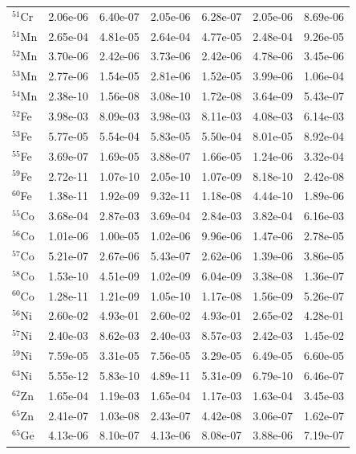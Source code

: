 \begin{table}
\begin{tabular}{l|cc|cc|cc}
$^{51}$Cr & 2.06e-06 & 6.40e-07 & 2.05e-06 & 6.28e-07 & 2.05e-06 & 8.69e-06\\
$^{51}$Mn & 2.65e-04 & 4.81e-05 & 2.64e-04 & 4.77e-05 & 2.48e-04 & 9.26e-05\\
$^{52}$Mn & 3.70e-06 & 2.42e-06 & 3.73e-06 & 2.42e-06 & 4.78e-06 & 3.45e-06\\
$^{53}$Mn & 2.77e-06 & 1.54e-05 & 2.81e-06 & 1.52e-05 & 3.99e-06 & 1.06e-04\\
$^{54}$Mn & 2.38e-10 & 1.56e-08 & 3.08e-10 & 1.72e-08 & 3.64e-09 & 5.43e-07\\
$^{52}$Fe & 3.98e-03 & 8.09e-03 & 3.98e-03 & 8.11e-03 & 4.08e-03 & 6.14e-03\\
$^{53}$Fe & 5.77e-05 & 5.54e-04 & 5.83e-05 & 5.50e-04 & 8.01e-05 & 8.92e-04\\
$^{55}$Fe & 3.69e-07 & 1.69e-05 & 3.88e-07 & 1.66e-05 & 1.24e-06 & 3.32e-04\\
$^{59}$Fe & 2.72e-11 & 1.07e-10 & 2.05e-10 & 1.07e-09 & 8.18e-10 & 2.42e-08\\
$^{60}$Fe & 1.38e-11 & 1.92e-09 & 9.32e-11 & 1.18e-08 & 4.44e-10 & 1.89e-06\\
$^{55}$Co & 3.68e-04 & 2.87e-03 & 3.69e-04 & 2.84e-03 & 3.82e-04 & 6.16e-03\\
$^{56}$Co & 1.01e-06 & 1.00e-05 & 1.02e-06 & 9.96e-06 & 1.47e-06 & 2.78e-05\\
$^{57}$Co & 5.21e-07 & 2.67e-06 & 5.43e-07 & 2.62e-06 & 1.39e-06 & 3.86e-05\\
$^{58}$Co & 1.53e-10 & 4.51e-09 & 1.02e-09 & 6.04e-09 & 3.38e-08 & 1.36e-07\\
$^{60}$Co & 1.28e-11 & 1.21e-09 & 1.05e-10 & 1.17e-08 & 1.56e-09 & 5.26e-07\\
$^{56}$Ni & 2.60e-02 & 4.93e-01 & 2.60e-02 & 4.93e-01 & 2.65e-02 & 4.28e-01\\
$^{57}$Ni & 2.40e-03 & 8.62e-03 & 2.40e-03 & 8.57e-03 & 2.42e-03 & 1.45e-02\\
$^{59}$Ni & 7.59e-05 & 3.31e-05 & 7.56e-05 & 3.29e-05 & 6.49e-05 & 6.60e-05\\
$^{63}$Ni & 5.55e-12 & 5.83e-10 & 4.89e-11 & 5.31e-09 & 6.79e-10 & 6.46e-07\\
$^{62}$Zn & 1.65e-04 & 1.19e-03 & 1.65e-04 & 1.17e-03 & 1.63e-04 & 3.45e-03\\
$^{65}$Zn & 2.41e-07 & 1.03e-08 & 2.43e-07 & 4.42e-08 & 3.06e-07 & 1.62e-07\\
$^{65}$Ge & 4.13e-06 & 8.10e-07 & 4.13e-06 & 8.08e-07 & 3.88e-06 & 7.19e-07\\
\hline
\end{tabular}
\end{table}
